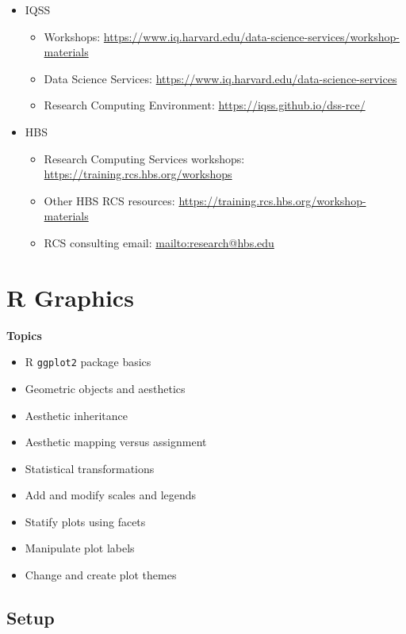 \documentclass[
]{book}
\providecommand{\tightlist}{%
  \setlength{\itemsep}{0pt}\setlength{\parskip}{0pt}}
\begin{document}
\begin{itemize}
\tightlist
\item
  IQSS

  \begin{itemize}
  \tightlist
  \item
    Workshops: \url{https://www.iq.harvard.edu/data-science-services/workshop-materials}
  \item
    Data Science Services: \url{https://www.iq.harvard.edu/data-science-services}
  \item
    Research Computing Environment: \url{https://iqss.github.io/dss-rce/}
  \end{itemize}
\item
  HBS

  \begin{itemize}
  \tightlist
  \item
    Research Computing Services workshops: \url{https://training.rcs.hbs.org/workshops}
  \item
    Other HBS RCS resources: \url{https://training.rcs.hbs.org/workshop-materials}
  \item
    RCS consulting email: \url{mailto:research@hbs.edu}
  \end{itemize}
\end{itemize}

\hypertarget{r-graphics}{%
\chapter{R Graphics}\label{r-graphics}}

\textbf{Topics}

\begin{itemize}
\tightlist
\item
  R \texttt{ggplot2} package basics
\item
  Geometric objects and aesthetics
\item
  Aesthetic inheritance
\item
  Aesthetic mapping versus assignment
\item
  Statistical transformations
\item
  Add and modify scales and legends
\item
  Statify plots using facets
\item
  Manipulate plot labels
\item
  Change and create plot themes
\end{itemize}

\hypertarget{setup-2}{%
\section{Setup}\label{setup-2}}
\end{document}
